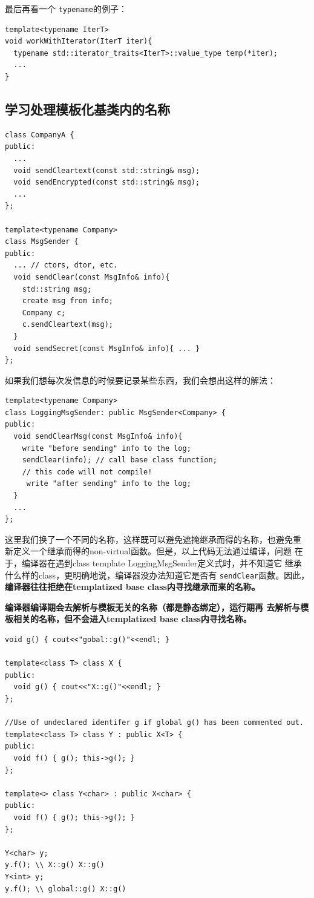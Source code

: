 \documentclass[a4paper,twoside]{article}
\theoremstyle{definition}
\theoremstyle{remark}
\numberwithin{equation}{section}
\let\OldTexttt\texttt
\renewcommand{\texttt}[1]{{\color{blue} \OldTexttt{#1}}}
\begin{document}
最后再看一个\texttt{typename}的例子：
\begin{verbatim}
template<typename IterT>
void workWithIterator(IterT iter){
  typename std::iterator_traits<IterT>::value_type temp(*iter);
  ...
}
\end{verbatim}

\subsection{学习处理模板化基类内的名称}
\label{sec:Item-43}

\begin{verbatim}
class CompanyA {
public:
  ...
  void sendCleartext(const std::string& msg);
  void sendEncrypted(const std::string& msg);
  ...
};

template<typename Company>
class MsgSender {
public:
  ... // ctors, dtor, etc.
  void sendClear(const MsgInfo& info){
    std::string msg;
    create msg from info;
    Company c;
    c.sendCleartext(msg);
  }
  void sendSecret(const MsgInfo& info){ ... }
};
\end{verbatim}

如果我们想每次发信息的时候要记录某些东西，我们会想出这样的解法：
\begin{verbatim}
template<typename Company>
class LoggingMsgSender: public MsgSender<Company> {
public:
  void sendClearMsg(const MsgInfo& info){
    write "before sending" info to the log;
    sendClear(info); // call base class function;
    // this code will not compile!
     write "after sending" info to the log;
  }
  ...
};
\end{verbatim}

这里我们换了一个不同的名称，这样既可以避免遮掩继承而得的名称，也避免重
新定义一个继承而得的non-virtual函数。但是，以上代码无法通过编译，问题
在于，编译器在遇到class template LoggingMsgSender定义式时，并不知道它
继承什么样的class，更明确地说，编译器没办法知道它是否有
\texttt{sendClear}函数。因此，\textbf{编译器往往拒绝在templatized base
  class内寻找继承而来的名称。}

\textbf{编译器编译期会去解析与模板无关的名称（都是静态绑定），运行期再
  去解析与模板相关的名称，但不会进入templatized base class内寻找名称。} 

\begin{verbatim}
void g() { cout<<"gobal::g()"<<endl; }

template<class T> class X {
public:
  void g() { cout<<"X::g()"<<endl; }
};

//Use of undeclared identifer g if global g() has been commented out.
template<class T> class Y : public X<T> {
public:
  void f() { g(); this->g(); }
};

template<> class Y<char> : public X<char> {
public:
  void f() { g(); this->g(); }
};

Y<char> y;
y.f(); \\ X::g() X::g()
Y<int> y;
y.f(); \\ global::g() X::g()
\end{verbatim}
\end{document}
